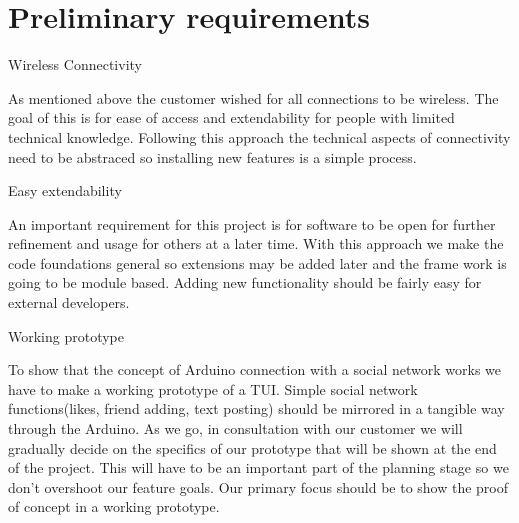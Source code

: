 \section{Preliminary requirements}


Wireless Connectivity

As mentioned above the customer wished for all connections to be wireless. The goal of this is for ease of access and extendability for people with limited technical knowledge. Following this approach the technical aspects of connectivity need to be abstraced so installing new features is a simple process.

Easy extendability

An important requirement for this project is for software to be open for further refinement and usage for others at a later time. With this approach we make the code foundations general so extensions may be added later and the frame work is going to be module based. Adding new functionality should be fairly easy for external developers. 

Working prototype

To show that the concept of Arduino connection with a social network works we have to make a working prototype of a TUI. Simple social network functions(likes, friend adding, text posting) should be mirrored in a tangible way through the Arduino. As we go, in consultation with our customer we will gradually decide on the specifics of our prototype that will be shown at the end of the project. This will have to be an important part of the planning stage so we don’t overshoot our feature goals. Our primary focus should be to show the proof of concept in a working prototype.